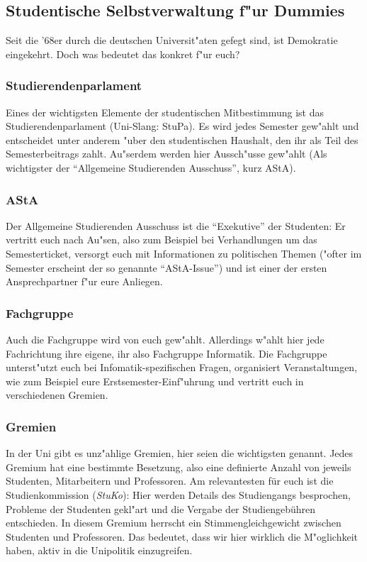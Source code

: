 \subsection{Studentische Selbstverwaltung f"ur Dummies}
Seit die '68er durch die deutschen Universit"aten gefegt sind, ist Demokratie eingekehrt.
Doch was bedeutet das konkret f"ur euch?
\subsubsection*{Studierendenparlament}
Eines der wichtigsten Elemente der studentischen Mitbestimmung ist das Studierendenparlament (Uni-Slang: StuPa).
Es wird jedes Semester gew"ahlt und entscheidet unter anderem "uber den studentischen Haushalt, den ihr als Teil des Semesterbeitrags zahlt.
Au"serdem werden hier Aussch"usse gew"ahlt (Als wichtigster der "`Allgemeine Studierenden Ausschuss"', kurz AStA).
\subsubsection*{AStA}
Der Allgemeine Studierenden Ausschuss ist die "`Exekutive"' der Studenten:
Er vertritt euch nach Au"sen, also zum Beispiel bei Verhandlungen um das Semesterticket, versorgt euch mit Informationen zu politischen Themen ("ofter im Semester erscheint der so genannte "`AStA-Issue"') und ist einer der ersten Ansprechpartner f"ur eure Anliegen.
\subsubsection*{Fachgruppe}
Auch die Fachgruppe wird von euch gew"ahlt.
Allerdings w"ahlt hier jede Fachrichtung ihre eigene, ihr also Fachgruppe Informatik.
Die Fachgruppe unterst"utzt euch bei Infomatik-spezifischen Fragen, organisiert Veranstaltungen, wie zum Beispiel eure Erstsemester-Einf"uhrung und vertritt euch in verschiedenen Gremien.
\subsubsection*{Gremien}
In der Uni gibt es unz"ahlige Gremien, hier seien die wichtigsten genannt.
Jedes Gremium hat eine bestimmte Besetzung, also eine definierte Anzahl von jeweils Studenten, Mitarbeitern und Professoren.
Am relevantesten für euch ist die Studienkommission (\emph{StuKo}):
Hier werden Details des Studiengangs besprochen, Probleme der Studenten gekl"art und die Vergabe der Studiengebühren entschieden.
In diesem Gremium herrscht ein Stimmengleichgewicht zwischen Studenten und Professoren.
Das bedeutet, dass wir hier wirklich die M"oglichkeit haben, aktiv in die Unipolitik einzugreifen.

